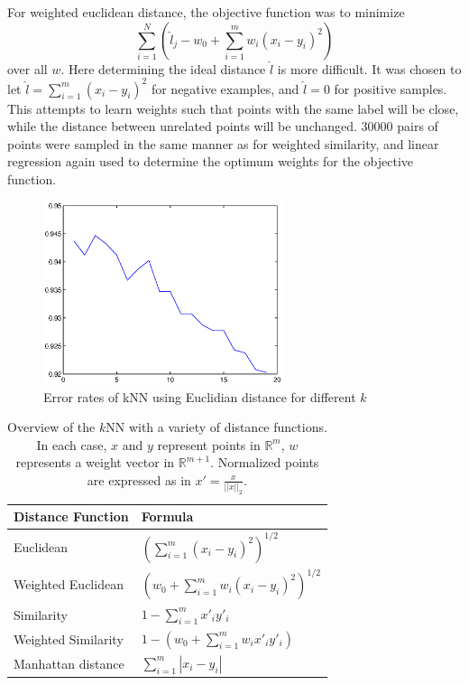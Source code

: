 \documentclass[10pt,twocolumn,letterpaper]{article}
\begin{document}
For weighted euclidean distance, the objective function was to minimize
\[ \sum_{i=1}^N \left( \hat{l}_j - w_0 + \sum_{i=1}^m w_i (x_i-y_i)^2 \right)\]
over all $w$.
Here determining the ideal distance $\hat{l}$ is more difficult. It was chosen to let $\hat{l} = \sum_{i=1}^m (x_i-y_i)^2 $ for negative examples, and $\hat{l}=0$ for positive samples. This attempts to learn weights such that points with the same label will be close, while the distance between unrelated points will be unchanged. 30000 pairs of points were sampled in the same manner as for weighted similarity, and linear regression again used to determine the optimum weights for the objective function.

\begin{figure}[htbp]
  \centering

    \begin{minipage}{7 cm}
      \includegraphics[width=7cm]{kplot}
      \caption{Error rates of kNN using Euclidian distance for different $k$}
      \label{kplots}
    \end{minipage}

\end{figure}



\begin{table}[htdp]
\begin{center}
\begin{tabular}{ll}
\toprule
\bf{Distance Function} & Formula \\
\midrule
Euclidean & $\left( \sum_{i=1}^m (x_i-y_i)^2 \right) ^{1/2}$ \\
Weighted Euclidean & $ \left( w_0 + \sum_{i=1}^m w_i (x_i-y_i)^2 \right)^{1/2}$ \\
Similarity & $1-\sum_{i=1}^m x'_i y'_i $ \\
Weighted Similarity & $1-\left(w_0 + \sum_{i=1}^m w_i x'_i y'_i \right) $ \\
Manhattan distance & $ \sum_{i=1}^m | x_i-y_i | $ \\
\bottomrule
\end{tabular}
\end{center}
\caption{Overview of the $k$NN with a variety of distance functions. In each case, $x$ and $y$ represent points in $\mathbb{R}^m$, $w$ represents a weight vector in $\mathbb{R}^{m+1}$. Normalized points are expressed as in $x' = \frac{x}{||x||_2}$. }
\label{tab:distfns}
\end{table}
\end{document}
